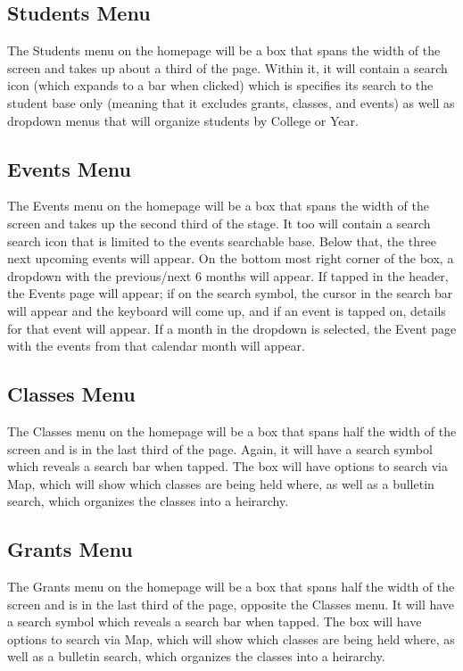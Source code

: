 \documentclass[12pt onesided letterpaper]{article}
\begin{document}
\subsection*{Students Menu}
The Students menu on the homepage will be a box that spans the width of the screen and takes up about a third of the page.  Within it, it will contain a search icon (which expands to a bar when clicked) which is specifies its search to the student base only (meaning that it excludes grants, classes, and events) as well as dropdown menus that will organize students by College or Year. 
\\
\subsection*{Events Menu}
The Events menu on the homepage will be a box that spans the width of the screen and takes up the second third of the stage.  It too will contain a search search icon  that is limited to the events searchable base. Below that, the three next upcoming events will appear.  On the bottom most right corner of the box, a dropdown with the previous/next 6 months will appear.  If tapped in the header, the Events page will appear; if on the search symbol, the cursor in the search bar will appear and the keyboard will come up, and if an event is tapped on, details for that event will appear. If a month in the dropdown is selected, the Event page with the events from that calendar month will appear.
\\
\subsection*{Classes Menu}
The Classes menu on the homepage will be a box that spans half the width of the screen and is in the last third of the page.  Again, it will have a search symbol which reveals a search bar when tapped. The box will have options to search via Map, which will show which classes are being held where, as well as a bulletin search, which organizes the classes into a heirarchy.
\\
\subsection*{Grants Menu}
The Grants menu on the homepage will be a box that spans half the width of the screen and is in the last third of the page, opposite the Classes menu.  It will have a search symbol which reveals a search bar when tapped. The box will have options to search via Map, which will show which classes are being held where, as well as a bulletin search, which organizes the classes into a heirarchy.
\\
\end{document}

